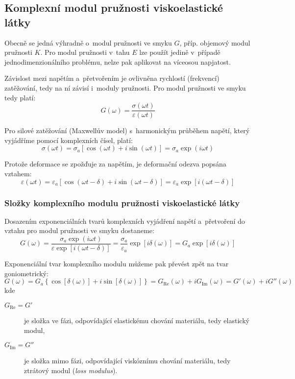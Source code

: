 
\subsection{Komplexní modul pružnosti viskoelastické látky}
Obecně se jedná výhradně o~modul pružnosti ve smyku $G$, příp. objemový modul pružnosti $K$.
Pro modul pružnosti v~tahu $E$ lze použít jedině v~případě jednodimenzionálního problému, nelze pak aplikovat na víceosou napjatost. 

Závislost mezi napětím a~přetvořením je ovlivněna rychlostí (frekvencí) zatěžování, tedy na ní závisí i~moduly pružnosti.
Pro modul pružnosti ve smyku tedy platí:
\begin{equation}
	G(\omega) = \frac{\sigma(\omega t)}{\varepsilon(\omega t)}
\end{equation}

Pro silové zatěžování (Maxwellův model) s~harmonickým průběhem napětí, který vyjádříme pomocí komplexních čísel, platí:
\begin{equation}
	\sigma(\omega t) = \sigma_a \left[\cos(\omega t) + i \sin(\omega t)\right] = \sigma_a \exp(i \omega t)
\end{equation}

Protože deformace se zpožďuje za napětím, je deformační odezva popsána vztahem:
\begin{equation}
	\varepsilon(\omega t) = \varepsilon_a \left[\cos(\omega t - \delta) + i \sin(\omega t - \delta)\right] = \varepsilon_a \exp[i (\omega t - \delta)]
\end{equation}

\subsubsection{Složky komplexního modulu pružnosti viskoelastické látky}
Dosazením exponenciálních tvarů komplexních vyjádření napětí a~přetvoření do vztahu pro modul pružnosti ve smyku dostaneme:
\begin{equation}
	G(\omega)
	= \frac{\sigma_a \exp(i \omega t)}{\varepsilon \exp\left[i(\omega t - \delta)\right]}
	= \frac{\sigma_a}{\varepsilon_a} \exp\left[i \delta(\omega)\right]
	= G_a \exp\left[i \delta(\omega)\right]
\end{equation}

Exponenciální tvar komplexního modulu můžeme pak převést zpět na tvar goniometrický:
\begin{equation}
	G(\omega)
	= G_a \left\{ \cos\left[\delta(\omega)\right] + i \sin\left[\delta(\omega)\right] \right\}
	= G_\text{Re}(\omega) + i G_\text{Im}(\omega)
	= G'(\omega) + i G''(\omega)
\end{equation}
kde
\begin{description}
	\item[$G_\text{Re}=G'$] je složka ve fázi, odpovídající elastickému chování materiálu, tedy elastický modul,
	\item[$G_\text{Im}=G''$] je složka mimo fázi, odpovídající viskóznímu chování materiálu, tedy ztrátový modul (\textit{loss modulus}).
\end{description}


